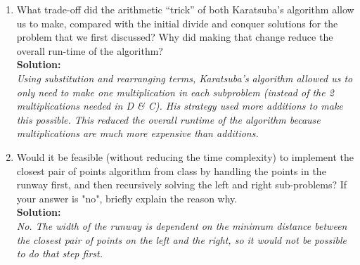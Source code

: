 \documentclass[10pt]{article}
\begin{document}
    \begin{enumerate}   
    	\item What trade-off did the arithmetic “trick” of both Karatsuba's algorithm allow us to make, compared with the initial divide and conquer solutions for the problem that we first discussed? Why did making that change reduce the overall run-time of the algorithm? \\
        \textbf{Solution:} \\
        \emph{
            Using substitution and rearranging terms, Karatsuba's algorithm allowed us to only need to make one multiplication in each subproblem (instead of the 2 multiplications needed in D \& C). His strategy used more additions to make this possible. This reduced the overall runtime of the algorithm because multiplications are much more expensive than additions.
        }
        \item Would it be feasible (without reducing the time complexity) to implement the closest pair of points algorithm from class by handling the points in the runway first, and then recursively solving the left and right sub-problems?  If your answer is "no", briefly explain the reason why. \\
        \textbf{Solution:} \\
        \emph{No. The width of the runway is dependent on the minimum distance between the closest pair of points on the left and the right, so it would not be possible to do that step first.}


\end{enumerate}
\end{document}
